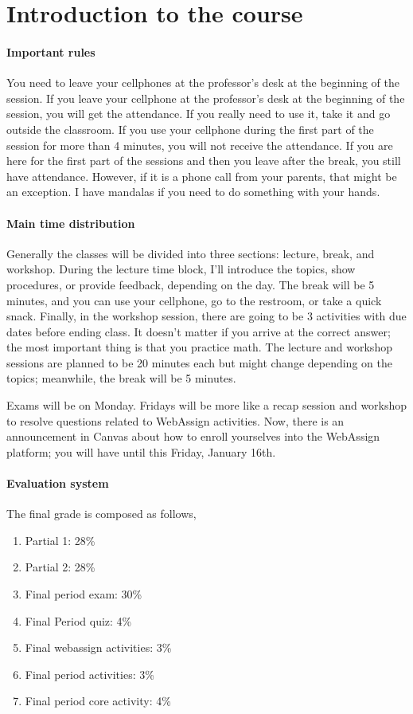 \documentclass[../main-notes.tex]{subfile}
\begin{document}
\justifying


\section{Introduction to the course}

\paragraph{Important rules} You need to leave your cellphones at the professor's desk at the beginning of the session.
If you leave your cellphone at the professor's desk at the beginning of the session, you will get the attendance.
If you really need to use it, take it and go outside the classroom.
If you use your cellphone during the first part of the session for more than 4 minutes, you will not receive the attendance.
If you are here for the first part of the sessions and then you leave after the break, you still have attendance.
However, if it is a phone call from your parents, that might be an exception.
I have mandalas if you need to do something with your hands.

\paragraph{Main time distribution} Generally the classes will be divided into three sections: lecture, break, and workshop.
During the lecture time block, I'll introduce the topics, show procedures, or provide feedback, depending on the day.
The break will be 5 minutes, and you can use your cellphone, go to the restroom, or take a quick snack.
Finally, in the workshop session, there are going to be 3 activities with due dates before ending class.
It doesn't matter if you arrive at the correct answer; the most important thing is that you practice math.
The lecture and workshop sessions are planned to be 20 minutes each but might change depending on the topics; meanwhile, the break will be 5 minutes.

Exams will be on Monday.
Fridays will be more like a recap session and workshop to resolve questions related to WebAssign activities.
Now, there is an announcement in Canvas about how to enroll yourselves into the WebAssign platform; you will have until this Friday, January 16th. 

\paragraph{Evaluation system} The final grade is composed as follows, 
\begin{enumerate}
    \item Partial 1: 28\%
    \item Partial 2: 28\%
    \item Final period exam: 30\%
    \item Final Period quiz: 4\%
    \item Final webassign activities: 3\%
    \item Final period activities: 3\%
    \item Final period core activity: 4\%
\end{enumerate}
\end{document}
